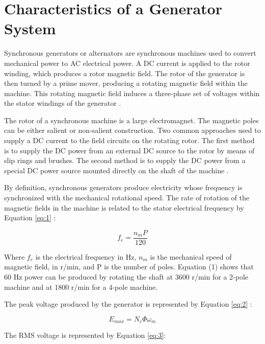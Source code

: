 \section{Characteristics of a Generator System}
Synchronous generators or alternators are synchronous machines used to convert mechanical power to AC electrical power. A DC current is applied to the rotor winding, which produces a rotor magnetic field. The rotor of the generator is then turned by a prime mover, producing a rotating magnetic field within the machine. This rotating magnetic field induces a three-phase set of voltages within the stator windings of the generator \cite{machinery}.

The rotor of a synchronous machine is a large electromagnet. The magnetic poles can be either salient or non-salient construction. Two common approaches used to supply a DC current to the field circuits on the rotating rotor. The first method is to supply the DC power from an external DC source to the rotor by means of slip rings and brushes. The second method is to supply the DC power from a special DC power source mounted directly on the shaft of the machine \cite{machinery}.

By definition, synchronous generators produce electricity whose frequency is synchronized with the mechanical rotational speed. The rate of rotation of the magnetic fields in the machine is related to the stator electrical frequency by Equation \eqref{eq:1} \cite{machinery}:

\begin{equation}\label{eq:1}
f_e = \frac{n_m P}{120}
\end{equation}

Where \begin{math}f_e\end{math} is the electrical frequency in Hz, \begin{math}n_m\end{math} is the mechanical speed of magnetic field, in r/min, and P is the number of poles. Equation (1) shows that 60 Hz power can be produced by rotating the shaft at 3600 r/min for a 2-pole machine and at 1800 r/min for a 4-pole machine.

The peak voltage produced by the generator is represented by Equation \eqref{eq:2} \cite{machinery}:

\begin{equation}\label{eq:2}
E_{max} = N_c\Phi\omega_m
\end{equation}

The RMS voltage is represented by Equation \eqref{eq:3}:

